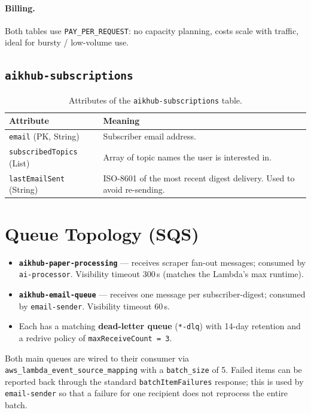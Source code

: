 \documentclass[11pt,a4paper]{article}
\begin{document}
\paragraph{Billing.} Both tables use \texttt{PAY\_PER\_REQUEST}: no capacity planning, costs scale with traffic, ideal for bursty / low-volume use.

\subsection{\texttt{aikhub-subscriptions}}

\begin{table}[h]
\centering
\begin{tabularx}{\linewidth}{lX}
\toprule
\textbf{Attribute} & \textbf{Meaning} \\
\midrule
\texttt{email} (PK, String)   & Subscriber email address. \\
\texttt{subscribedTopics} (List) & Array of topic names the user is interested in. \\
\texttt{lastEmailSent} (String) & ISO-8601 of the most recent digest delivery. Used to avoid re-sending. \\
\bottomrule
\end{tabularx}
\caption{Attributes of the \texttt{aikhub-subscriptions} table.}
\end{table}

\section{Queue Topology (SQS)}

\begin{itemize}[leftmargin=*]
  \item \textbf{\texttt{aikhub-paper-processing}} --- receives scraper fan-out messages; consumed by \texttt{ai-processor}. Visibility timeout 300\,s (matches the Lambda's max runtime).
  \item \textbf{\texttt{aikhub-email-queue}} --- receives one message per subscriber-digest; consumed by \texttt{email-sender}. Visibility timeout 60\,s.
  \item Each has a matching \textbf{dead-letter queue} (\texttt{*-dlq}) with 14-day retention and a redrive policy of \texttt{maxReceiveCount = 3}.
\end{itemize}

Both main queues are wired to their consumer via \texttt{aws\_lambda\_event\_source\_mapping} with a \texttt{batch\_size} of 5. Failed items can be reported back through the standard \texttt{batchItemFailures} response; this is used by \texttt{email-sender} so that a failure for one recipient does not reprocess the entire batch.
\end{document}
